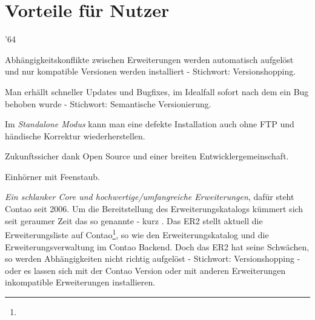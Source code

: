 \documentclass[
paper=a4,
draft=false,%
fontsize=10pt%
]{scrartcl}
\begin{document}
\newpage

%
%

\section{Vorteile für Nutzer}
\label{sec:pros-for-users}

\begin{minipage}{.02\linewidth}
\end{minipage}
\begin{minipage}{.98\linewidth}
  \begin{dinglist}{'64}
  \item Abhängigkeitskonflikte zwischen Erweiterungen werden automatisch aufgelöst und nur kompatible Versionen werden installiert - Stichwort: Versionshopping\footnotemark.
  \item Man erhällt schneller Updates und Bugfixes, im Idealfall sofort nach dem ein Bug behoben wurde - Stichwort: Semantische Versionierung\footnotemark.
  \item Im \textit{Standalone Modus} kann man eine defekte Installation auch ohne FTP und händische Korrektur wiederherstellen.
  \item Zukunftssicher dank Open Source und einer breiten Entwicklergemeinschaft.
  \item Einhörner mit Feenstaub.
  \end{dinglist}
\end{minipage}

\addtocounter{footnote}{-1}

\textit{Ein schlanker Core und hochwertige/umfangreiche Erweiterungen}, dafür steht Contao seit 2006. Um die Bereitstellung des Erweiterungskatalogs kümmert sich seit geraumer Zeit das so genannte  - kurz . Das ER2 stellt aktuell die Erweiterungsliste auf Contao\footnote{}, so wie den Erweiterungskatalog und die Erweiterungsverwaltung im Contao Backend. Doch das ER2 hat seine Schwächen, so werden Abhängigkeiten nicht richtig aufgelöst - Stichwort: Versionshopping - oder es lassen sich mit der Contao Version oder mit anderen Erweiterungen inkompatible Erweiterungen installieren.
\end{document}
